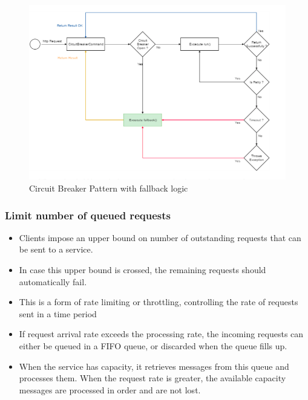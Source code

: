\documentclass{article}
\begin{document}
\begin{figure}[!h]
    \centering
    \includegraphics[scale=0.4]{fallback.png}
    \caption{Circuit Breaker Pattern with fallback logic}
    \label{fig:my_label}
\end{figure}

\subsubsection{Limit number of queued requests}
\begin{itemize}
    \item Clients impose an upper bound on number of outstanding requests that can be sent to a service. 
    
    \item In case this upper bound is crossed, the remaining requests should automatically fail. 
    
    \item This is a form of rate limiting or throttling, controlling the rate of requests sent in a time period
    
    \item If request arrival rate exceeds the processing rate, the incoming requests can either be queued in a FIFO queue, or discarded when the queue fills up. 
    
    \item When the service has capacity, it retrieves messages from this queue and processes them. When the request rate is greater, the available capacity messages are processed in order and are not lost. 

\end{itemize}
\end{document}

